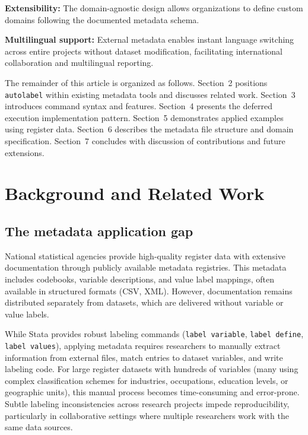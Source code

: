 \textbf{Extensibility:} The domain-agnostic design allows organizations to define custom domains following the documented metadata schema.

\textbf{Multilingual support:} External metadata enables instant language switching across entire projects without dataset modification, facilitating international collaboration and multilingual reporting.

The remainder of this article is organized as follows. Section~2 positions \texttt{autolabel} within existing metadata tools and discusses related work. Section~3 introduces command syntax and features. Section~4 presents the deferred execution implementation pattern. Section~5 demonstrates applied examples using register data. Section~6 describes the metadata file structure and domain specification. Section~7 concludes with discussion of contributions and future extensions.




\section{Background and Related Work}

\subsection{The metadata application gap}

National statistical agencies provide high-quality register data with extensive documentation through publicly available metadata registries. This metadata includes codebooks, variable descriptions, and value label mappings, often available in structured formats (CSV, XML). However, documentation remains distributed separately from datasets, which are delivered without variable or value labels.

While Stata provides robust labeling commands (\texttt{label variable}, \texttt{label define}, \texttt{label values}), applying metadata requires researchers to manually extract information from external files, match entries to dataset variables, and write labeling code. For large register datasets with hundreds of variables (many using complex classification schemes for industries, occupations, education levels, or geographic units), this manual process becomes time-consuming and error-prone. Subtle labeling inconsistencies across research projects impede reproducibility, particularly in collaborative settings where multiple researchers work with the same data sources.

